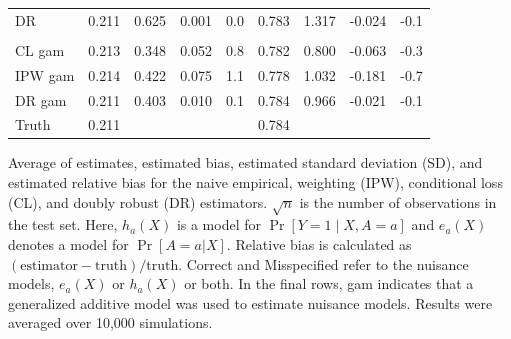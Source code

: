 \begin{table}[t]
\begin{threeparttable}
\begin{tabular}{lcccccccc}
    \hspace{1em}DR & 0.211 & 0.625 & 0.001 & 0.0 & 0.783 & 1.317 & -0.024 & -0.1\\
    \addlinespace[0.3em]
    \multicolumn{9}{l}{Both misspecified}\\
    \hspace{1em}CL gam & 0.213 & 0.348 & 0.052 & 0.8 & 0.782 & 0.800 & -0.063 & -0.3\\
    \hspace{1em}IPW gam & 0.214 & 0.422 & 0.075 & 1.1 & 0.778 & 1.032 & -0.181 & -0.7\\
    \hspace{1em}DR gam & 0.211 & 0.403 & 0.010 & 0.1 & 0.784 & 0.966 & -0.021 & -0.1\\
    Truth & 0.211 & &  &  & 0.784 & &  & \\
    \bottomrule
    \end{tabular}
    \begin{tablenotes}
    \item Average of estimates, estimated bias, estimated standard deviation (SD), and estimated relative bias for the naive empirical, weighting (IPW), conditional loss (CL), and doubly robust (DR) estimators. $\sqrt{n}$ is the number of observations in the test set. Here, $h_a(X)$ is a model for $\operatorname{Pr}[Y=1 \mid X, A=a]$ and $e_a(X)$ denotes a model for $\Pr[A = a|X]$. Relative bias is calculated as $(\text{estimator} -\text{truth})/\text{truth}$. Correct and Misspecified refer to the nuisance models, $e_a(X)$ or $h_a(X)$ or both. In the final rows, gam indicates that a generalized additive model was used to estimate nuisance models. Results were averaged over 10,000 simulations.
    \end{tablenotes}
    \end{threeparttable}
\end{table}

